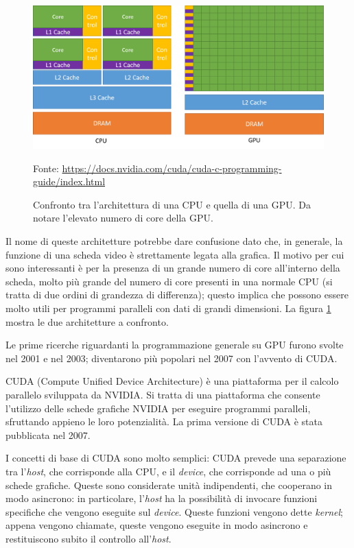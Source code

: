 \documentclass[12pt,a4paper,openright,twoside]{report}
\newcommand{\source}[1]{\vspace{-10pt} \caption*{\scriptsize Fonte: {#1}} }
\begin{document}
\begin{figure}[h]
    \centering
    \includegraphics[width=\textwidth]{cpu-gpu-comparison.png}
    \caption[Confronto tra CPU e GPU]{Confronto tra l'architettura di una CPU e quella di una GPU. Da notare l'elevato numero di core della GPU.}
    \source{\url{https://docs.nvidia.com/cuda/cuda-c-programming-guide/index.html}}
    \label{img:cpu-gpu-comparison}
\end{figure}

Il nome di queste architetture potrebbe dare confusione dato che, in generale, la funzione di una scheda video è strettamente legata alla grafica. Il motivo per cui sono interessanti è per la presenza di un grande numero di core all'interno della scheda, molto più grande del numero di core presenti in una normale CPU (si tratta di due ordini di grandezza di differenza); questo implica che possono essere molto utili per programmi paralleli con dati di grandi dimensioni. La figura \ref{img:cpu-gpu-comparison} mostra le due architetture a confronto.

Le prime ricerche riguardanti la programmazione generale su GPU furono svolte nel 2001 e nel 2003; diventarono più popolari nel 2007 con l'avvento di CUDA.

CUDA (Compute Unified Device Architecture) è una piattaforma per il calcolo parallelo sviluppata da NVIDIA. Si tratta di una piattaforma che consente l'utilizzo delle schede grafiche NVIDIA per eseguire programmi paralleli, sfruttando appieno le loro potenzialità. La prima versione di CUDA è stata pubblicata nel 2007.

I concetti di base di CUDA sono molto semplici: CUDA prevede una separazione tra l'\textit{host}, che corrisponde alla CPU, e il \textit{device}, che corrisponde ad una o più schede grafiche. Queste sono considerate unità indipendenti, che cooperano in modo asincrono: in particolare, l'\textit{host} ha la possibilità di invocare funzioni specifiche che vengono eseguite sul \textit{device}. Queste funzioni vengono dette \textit{kernel}; appena vengono chiamate, queste vengono eseguite in modo asincrono e restituiscono subito il controllo all'\textit{host}.
\end{document}
